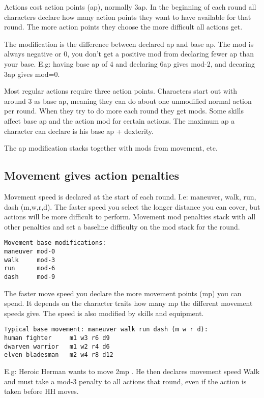 Actions cost action points (ap), normally 3ap. In the beginning of each round all characters declare how many action points they want to have available for that round. The more action points they choose the more difficult all actions get.

The modification is the difference between declared ap and base ap. The mod is always negative or 0, you don't get a positive mod from declaring fewer ap than your base. E.g: having base ap of 4 and declaring 6ap gives mod-2, and decaring 3ap gives mod=0.

Most regular actions require three action points. Characters start out with around 3 as base ap, meaning they can do about one unmodified normal action per round. When they try to do more each round they get mods. Some skills affect base ap and the action mod for certain actions.
The maximum ap a character can declare is his base ap + dexterity.

The ap modification stacks together with mods from movement, etc.



\subsection*{Movement gives action penalties}
Movement speed is declared at the start of each round. I.e: maneuver, walk, run, dash (m,w,r,d). The faster speed you select the longer distance you can cover, but actions will be more difficult to perform. Movement mod penalties stack with all other penalties and set a baseline difficulty on the mod stack for the round.

\small \begin{verbatim}
Movement base modifications:
maneuver mod-0
walk     mod-3
run      mod-6
dash     mod-9
\end{verbatim} \normalsize

The faster move speed you declare the more movement points (mp) you can spend. It depends on the character traits how many mp the different movement speeds give. The speed is also modified by skills and equipment.

\small \begin{verbatim}
Typical base movement: maneuver walk run dash (m w r d):
human fighter     m1 w3 r6 d9
dwarven warrior   m1 w2 r4 d6
elven bladesman   m2 w4 r8 d12
\end{verbatim} \normalsize

E.g: Heroic Herman wants to move 2mp . He then declares movement speed Walk and must take a mod-3 penalty to all actions that round, even if the action is taken before HH moves.


